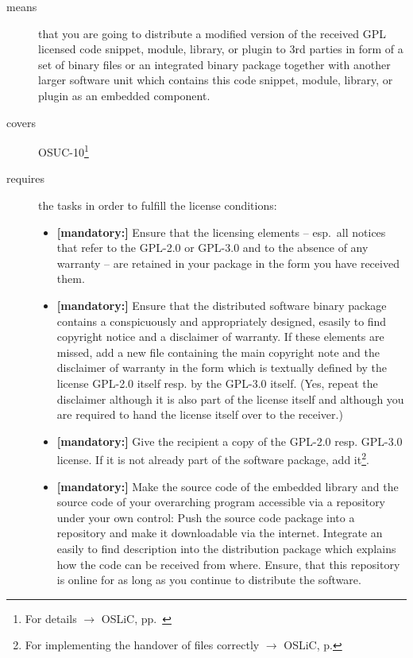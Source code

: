 \begin{description}
\item[means] that you are going to distribute a modified version of the received
GPL licensed code snippet, module, library, or plugin to 3rd parties in form
of a set of binary files or an integrated binary package together with another
larger software unit which contains this code snippet, module, library, or
plugin as an embedded component.
\item[covers] OSUC-10\footnote{For details $\rightarrow$ OSLiC, pp.\ \pageref{OSUC-10-DEF}}
\item[requires] the tasks in order to fulfill the license conditions:
\begin{itemize}
  

  \item \textbf{[mandatory:]} Ensure that the licensing elements -- esp.\ all
  notices that refer to the GPL-2.0 or GPL-3.0 and to the absence of any
  warranty -- are retained in your package in the form you have received them.

  \item \textbf{[mandatory:]} Ensure that the distributed software binary
  package contains a conspicuously and appropriately designed, esasily to find
  copyright notice and a disclaimer of warranty. If these elements are missed,
  add a new file containing the main copyright note and the disclaimer of
  warranty in the form which is textually defined by the license GPL-2.0 itself
  resp. by the GPL-3.0 itself. (Yes, repeat the disclaimer although it is also
  part of the license itself and although you are required to hand the license
  itself over to the receiver.)
  
  \item \textbf{[mandatory:]} Give the recipient a copy of the GPL-2.0 resp.
  GPL-3.0 license. If it is not already part of the software package, add
  it\footnote{For implementing the handover of files correctly $\rightarrow$
  OSLiC, p. \pageref{DistributingFilesHint}}.

  \item \textbf{[mandatory:]} Make the source code of the embedded library and
  the source code of your overarching program accessible via a repository under
  your own control: Push the source code package into a repository and make it
  downloadable via the internet. Integrate an easily to find description into
  the distribution package which explains how the code can be received from
  where. Ensure, that this repository is online for as long as you continue to
  distribute the software.


\end{itemize}
\end{description}
